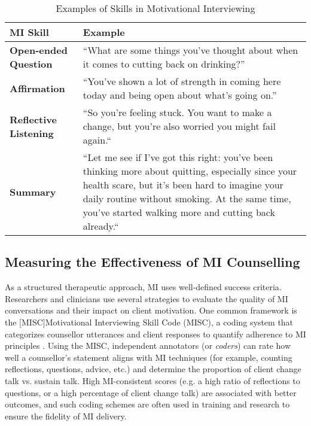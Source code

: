 \begin{table}[ht!]
\centering
\begin{tabular}{@{} p{} p{} @{}}
\toprule
\textbf{MI Skill} & \textbf{Example} \\
\midrule
\textbf{Open-ended Question} & 
``What are some things you've thought about when it comes to cutting back on drinking?'' \\
\addlinespace
\textbf{Affirmation} & 
``You've shown a lot of strength in coming here today and being open about what’s going on.'' \\
\addlinespace
\textbf{Reflective Listening} & 
``So you're feeling stuck. You want to make a change, but you're also worried you might fail again.`` \\
\addlinespace
\textbf{Summary} & 
``Let me see if I've got this right: you've been thinking more about quitting, especially since your health scare, but it's been hard to imagine your daily routine without smoking. At the same time, you’ve started walking more and cutting back already.`` \\
\bottomrule
\end{tabular}
\caption{Examples of Skills in Motivational Interviewing}
\label{tab:mi_skill_examples}
\end{table}




\subsection{Measuring the Effectiveness of MI Counselling}
As a structured therapeutic approach, MI uses well-defined success criteria. Researchers and clinicians use several strategies to evaluate the quality of MI conversations and their impact on client motivation. One common framework is the [MISC]Motivational Interviewing Skill Code (MISC), a coding system that categorizes counsellor utterances and client responses to quantify adherence to MI principles \cite{Houck2010}. Using the MISC, independent annotators (or \emph{coders})  can rate how well a counsellor's statement aligns with MI techniques (for example, counting reflections, questions, advice, etc.) and determine the proportion of client change talk vs. sustain talk. High MI-consistent scores (e.g. a high ratio of reflections to questions, or a high percentage of client change talk) are associated with better outcomes, and such coding schemes are often used in training and research to ensure the fidelity of MI delivery.

